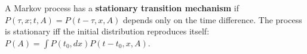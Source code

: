A Markov process has a \textbf{stationary transition mechanism} if $P(\tau, x; t, A) = P(t - \tau, x, A)$ depends only on the time difference. The process is stationary iff the initial distribution reproduces itself: $P(A) = \int P(t_0, dx) P(t - t_0, x, A)$.
